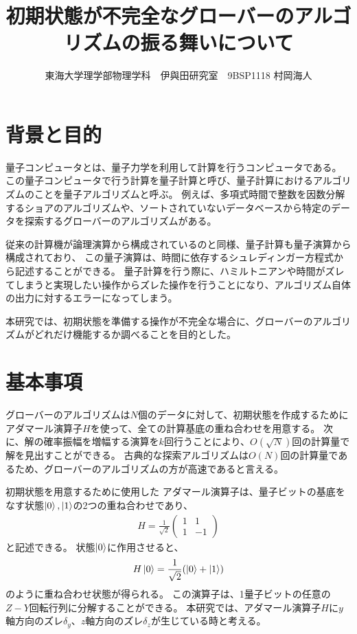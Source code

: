 \documentclass[platex,dvipdfmx, twocolumn]{jsarticle}			%
\title{初期状態が不完全なグローバーのアルゴリズムの振る舞いについて}
\author{東海大学理学部物理学科　伊與田研究室　9BSP1118 村岡海人}
\date{}
\begin{document}
\maketitle
\section{背景と目的}
量子コンピュータとは、量子力学を利用して計算を行うコンピュータである。
この量子コンピュータで行う計算を量子計算と呼び、量子計算におけるアルゴリズムのことを量子アルゴリズムと呼ぶ。
例えば、多項式時間で整数を因数分解するショアのアルゴリズムや、ソートされていないデータベースから特定のデータを探索するグローバーのアルゴリズムがある。

従来の計算機が論理演算から構成されているのと同様、量子計算も量子演算から構成されており、
この量子演算は、時間に依存するシュレディンガー方程式から記述することができる。
量子計算を行う際に、ハミルトニアンや時間がズレてしまうと実現したい操作からズレた操作を行うことになり、アルゴリズム自体の出力に対するエラーになってしまう。

本研究では、初期状態を準備する操作が不完全な場合に、グローバーのアルゴリズムがどれだけ機能するか調べることを目的とした。

\section{基本事項}
グローバーのアルゴリズムは$N個$のデータに対して、初期状態を作成するためにアダマール演算子$H$を使って、全ての計算基底の重ね合わせを用意する。
次に、解の確率振幅を増幅する演算を$k$回行うことにより、$O(\sqrt{N})$回の計算量で解を見出すことができる。
古典的な探索アルゴリズムは$O(N)$回の計算量であるため、グローバーのアルゴリズムの方が高速であると言える\cite{QuantumDojo}。

初期状態を用意するために使用した
アダマール演算子は、量子ビットの基底をなす状態$\ket{0},\ket{1}$の2つの重ね合わせであり、
\begin{eqnarray*}
    H = \frac{1}{\sqrt{2}}\begin{pmatrix}
        1 & 1\\
        1 & -1
    \end{pmatrix}
\end{eqnarray*}
と記述できる。
状態$\ket{0}$に作用させると、
\begin{eqnarray*}
    H\ket{0} = \frac{1}{\sqrt{2}}(\ket{0} + \ket{1})
\end{eqnarray*}
のように重ね合わせ状態が得られる\cite{BasicQuantumComputer}。
この演算子は、1量子ビットの任意の$Z-Y$回転行列に分解することができる\cite{QuantumComputingFundamentalsAndPhysicsContacts}。
本研究では、アダマール演算子$H$に$y$軸方向のズレ$\delta_y$、$z$軸方向のズレ$\delta_z$が生じている時と考える。
\end{document}
